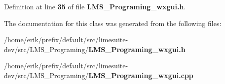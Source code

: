 Definition at line {\bf 35} of file {\bf L\+M\+S\+\_\+\+Programing\+\_\+wxgui.\+h}.



The documentation for this class was generated from the following files\+:\begin{DoxyCompactItemize}
\item 
/home/erik/prefix/default/src/limesuite-\/dev/src/\+L\+M\+S\+\_\+\+Programing/{\bf L\+M\+S\+\_\+\+Programing\+\_\+wxgui.\+h}\item 
/home/erik/prefix/default/src/limesuite-\/dev/src/\+L\+M\+S\+\_\+\+Programing/{\bf L\+M\+S\+\_\+\+Programing\+\_\+wxgui.\+cpp}\end{DoxyCompactItemize}
